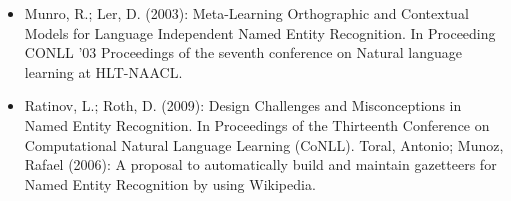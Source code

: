 \documentclass{beamer}
\begin{document}
	\begin{frame}
			\begin{itemize}
				\item Munro, R.; Ler, D. (2003): Meta-Learning Orthographic and Contextual Models for Language Independent Named Entity Recognition. In Proceeding
				CONLL '03 Proceedings of the seventh conference on Natural language learning at HLT-NAACL.\\
				\item Ratinov, L.; Roth, D. (2009): Design Challenges and Misconceptions in Named Entity Recognition. In Proceedings of the Thirteenth Conference on Computational Natural Language Learning (CoNLL).
				Toral, Antonio; Munoz, Rafael (2006): A proposal to automatically build and maintain gazetteers for Named Entity Recognition by using Wikipedia.
			\end{itemize}
	\end{frame}
\end{document}
